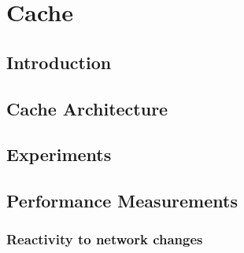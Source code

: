 \chapter{Cache} %
\label{cha:cache}

\minitoc

\lipsum

\section{Introduction} %
\label{sec:cache_introduction}

\lipsum


\section{Cache Architecture} %
\label{sec:cache_architecture}

\lipsum


\section{Experiments} %
\label{sec:cache_experiments}

\lipsum


\section{Performance Measurements} %
\label{sec:performance_measurements}

\subsection{Reactivity to network changes} %
\label{sub:reactivity_to_network_changes}

